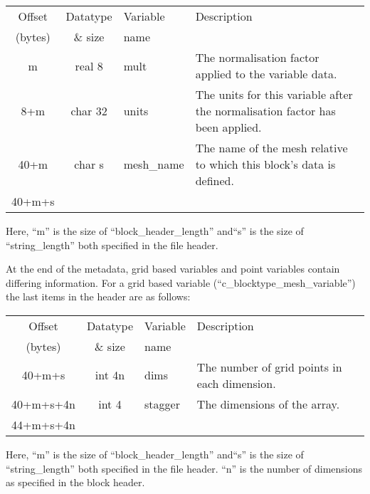 \documentclass[12pt]{article}
\begin{document}
\begin{center}
\begin{tabularx}{0.9\textwidth}[!hbt]{cclX}
  Offset & Datatype & Variable & Description\\
  (bytes) & \& size & name &
  \\\toprule

  m & real 8 & mult & The normalisation factor applied to the variable data.
  \\\midrule

  8+m & char 32 & units & The units for this variable after the normalisation
  factor has been applied.
  \\\midrule

  40+m & char s & mesh\_name & The name of the mesh relative to which this
  block's data is defined.
  \\\midrule

  40+m+s &
\end{tabularx}
\end{center}\vspace{10pt}

Here, ``m'' is the size of ``block\_header\_length'' and``s'' is the size of
``string\_length'' both specified in the file header.

At the end of the metadata, grid based variables and point variables contain
differing information. For a grid based variable
(``c\_blocktype\_mesh\_variable'') the last items in the header are as
follows:\\

\begin{center}
\begin{tabularx}{0.9\textwidth}[!hbt]{cclX}
  Offset & Datatype & Variable & Description\\
  (bytes) & \& size & name &
  \\\toprule

  40+m+s & int 4n & dims & The number of grid points in each dimension.
  \\\midrule

  40+m+s+4n & int 4 & stagger & The dimensions of the array.
  \\\midrule

  44+m+s+4n &
\end{tabularx}
\end{center}\vspace{10pt}

Here, ``m'' is the size of ``block\_header\_length'' and``s'' is the size of
``string\_length'' both specified in the file header.
``n'' is the number of dimensions as specified in the block header.
\end{document}
